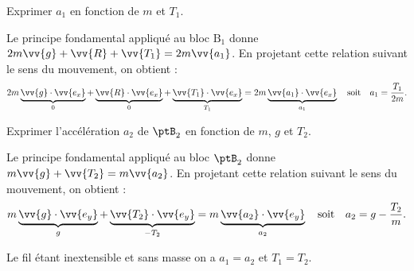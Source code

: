\debutEntrainement



\begin{enonce}
	 Exprimer $a_1$ en fonction de $m$ et $T_1$. 
\end{enonce}


\begin{corrige}
	Le principe fondamental appliqué au bloc $\text{B}_1$ donne $2m\vv{g}+\vv{R}+\vv{T_1}=2m \vv{a_1}$. En projetant cette relation suivant le sens du mouvement, on obtient : 
	\[
		2m\underbrace{\vv{g}\cdot\vv{e_x}}_{0}+
		\underbrace{\vv{R}\cdot\vv{e_x}}_{0}+
		\underbrace{\vv{T_1}\cdot\vv{e_x}}_{T_1}=
		2m \underbrace{\vv{a_1}\cdot\vv{e_x}}_{a_1}
		\quad\text{soit}\quad
		a_1=\frac{T_1}{2m}.
	\]
\end{corrige}




\begin{enonce}
	 Exprimer l'accélération $a_2$ de $\ptB_2$ en fonction de $m$, $g$ et $T_2$. 
\end{enonce}


\begin{corrige}
	Le principe fondamental appliqué au bloc $\ptB_2$ donne $m\vv{g}+\vv{T_2}=m \vv{a_2}$. En projetant cette relation suivant le sens du mouvement, on obtient : 
	\[
		m\underbrace{\vv{g}\cdot\vv{e_y}}_{g}+
		\underbrace{\vv{T_2}\cdot\vv{e_y}}_{-T_2}=
		m \underbrace{\vv{a_2}\cdot\vv{e_y}}_{a_2}
		\quad\text{soit}\quad
		a_2=g-\frac{T_2}{m}.
	\]
\end{corrige}



\pauseEntrainement

Le fil étant inextensible et sans masse on a $a_1=a_2$ et $T_1=T_2$.

